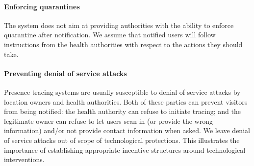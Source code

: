 \paragraph{Enforcing quarantines} The system does not aim at providing authorities with the ability to enforce quarantine after notification. We assume that notified users will follow instructions from the health authorities with respect to the actions they should take.

\paragraph{Preventing denial of service attacks} Presence tracing systems are usually susceptible to denial of service attacks by location owners and health authorities. Both of these parties can prevent visitors from being notified: the health authority can refuse to initiate tracing; and the legitimate owner can refuse to let users scan in (or provide the wrong information) and/or not provide contact information when asked.
We leave denial of service attacks out of scope of technological protections. This illustrates the importance of establishing appropriate incentive structures around technological interventions.